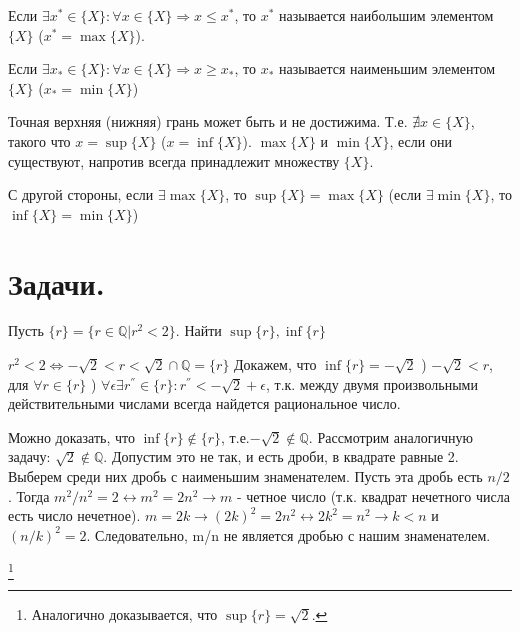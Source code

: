 \documentclass[10pt]{article}
\begin{document}
\begin{definition}

Если $\exists x^* \in \{X\}: \forall x\in\{X\} \Longrightarrow x \leqslant x^*$, то $x^*$ называется наибольшим элементом $\{X\}$  ($x^*\!=\max\{X\}$).

Если $\exists x_* \in \{X\}: \forall x\in\{X\} \Longrightarrow x \geqslant x_*$, то $x_*$ называется наименьшим элементом $\{X\}$  ($x_*\!=\min\{X\}$)

\end{definition}

\begin{remark}
Точная верхняя (нижняя) грань может быть и не достижима. Т.е. $\nexists x \in \{X\}$, такого что $x\!=\sup\{X\}$ ($x\!=\inf\{X\}$). $\max \{X\}$ и $\min\{X\}$, если они существуют, напротив всегда принадлежит множеству $ \{X\}$.


С другой стороны, если $\exists \max\{X\}$, то $\sup\{X\}\!=\max\{X\}$ (если $\exists \min\{X\}$, то $\inf\{X\}\!=\min\{X\}$)
\end{remark}


\section[Задачи]{Задачи.}\label{sec:problems_9}

\begin{problem}
\emph{} Пусть $\{r\}=\{r \in \mathbb{Q}  |  r^2<2\}$. Найти $\sup\{r\},\inf\{r\}$

\end{problem}
\begin{solution}
 $r^2<2 \Longleftrightarrow {-\sqrt 2<r<\sqrt 2} \cap \mathbb{Q} = \{r\} $ \newline
Докажем, что $\inf\{r\}=-\sqrt2$ ) $-\sqrt2<r$, для $\forall r \in \{r\}$
) $\forall \epsilon \exists r^{''} \in \{r\}: r^{''} < -\sqrt 2 + \epsilon $, т.к. между двумя произвольными действительными числами всегда найдется рациональное число. 

\medskip
Можно доказать, что $\inf\{r\} \notin \{r\}$, т.е.$ -\sqrt2 \notin \mathbb{Q}$.
 Рассмотрим аналогичную задачу: $\sqrt2 \notin \mathbb{Q}$. Допустим это не так, и есть дроби, в квадрате равные 2. Выберем среди них дробь с наименьшим знаменателем. Пусть эта дробь есть $n/2$. Тогда $m^2/n^2=2 \leftrightarrow m^2=2n^2 \rightarrow m$ - четное число (т.к. квадрат нечетного числа есть число нечетное). $m=2k \rightarrow (2k)^2=2n^2 \leftrightarrow 2k^2=n^2 \rightarrow k<n$ и $(n/k)^2=2.$ Следовательно, m/n не является дробью с нашим знаменателем.

\footnote{ Аналогично доказывается, что $\sup\{r\}=\sqrt2.$}



\end{solution}
\end{document}
